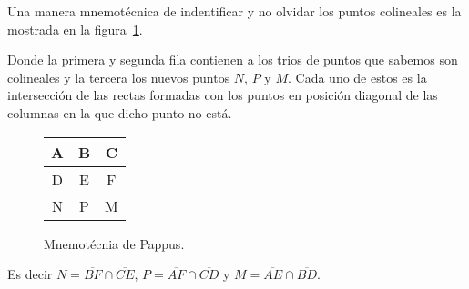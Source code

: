 \begin{remark.tcb}
    Una manera mnemotécnica de indentificar y no olvidar los puntos colineales es la mostrada en la figura~\ref{fig:pappus-mnemonic}.
    \begin{multicols}{2}
        Donde la primera y segunda fila contienen a los trios de puntos que sabemos son colineales y la tercera los nuevos puntos $N$, $P$ y $M$.
        Cada uno de estos es la intersección de las rectas formadas con los puntos en posición diagonal de las columnas en la que dicho punto no está.
        \begin{figure}[H]
            \centering
            \begin{tabular}{|c|c|c|}
                \hline
                A & B & C\\\hline
                D & E & F\\
                \hline \hline
                N & P & M\\
                \hline
            \end{tabular}
            \caption{Mnemotécnia de Pappus.}
            \label{fig:pappus-mnemonic}
        \end{figure}
        Es decir $N = \overline{BF} \cap \overline{CE}$, $P = \overline{AF} \cap \overline{CD}$ y $M = \overline{AE} \cap \overline{BD}$.
    \end{multicols}
\end{remark.tcb}

